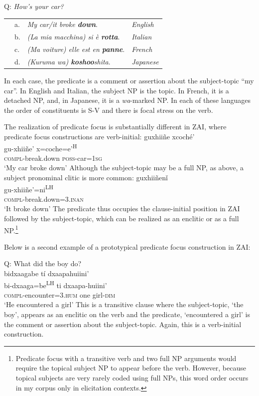 \ea\label{PF}Q: \textit{How's your car?}
\begin{table}[H] 
\begin{tabular}{l l l l}
 & a. & \textit{My car/it broke \textbf{down}}. & \textit{English} \\
 & b. & \textit{(La mia macchina) si \`{e} \textbf{rotta}}. & \textit{Italian} \\
 & c. & \textit{(Ma voiture) elle est en \textbf{panne}}. & \textit{French} \\
  & d. & \textit{(Kuruma wa) \textbf{koshoo}shita}. & \textit{Japanese} \\
\end{tabular}
\end{table}
\z

In each case, the predicate is a comment or assertion about the subject-topic ``my car''. In English and Italian, the subject NP is the topic. In French, it is a detached NP, and, in Japanese, it is a \textit{wa}-marked NP. In each of these languages the order of constituents is S-V and there is focal stress on the verb. 

The realization of predicate focus is substantially different in ZAI, where predicate focus constructions are verb-initial: 
\ea\label{predfoc1}
\glll guxhii\~{n}e xcoch\'{e}'  \\
gu-xhii\~{n}e' x=coche=e'\textsuperscript{H}  \\
\textsc{compl}-break.down \textsc{poss}-car=\textsc{1sg}  \\
\glt `My car broke down'
\z
Although the subject-topic may be a full NP, as above, a subject pronominal clitic is more common:
\ea\label{predfoc2}
\glll guxhii\~{n}en\v{i} \\
gu-xhii\~{n}e'=ni\textsuperscript{LH}  \\
\textsc{compl}-break.down=\textsc{3.inan} \\
\glt `It broke down'
\z
The predicate thus occupies the clause-initial position in ZAI followed by the subject-topic, which can be realized as an enclitic or as a full NP.\footnote{Predicate focus with a transitive verb and two full NP arguments would require the topical subject NP to appear before the verb. However, because topical subjects are very rarely coded using full NPs, this word order occurs in my corpus only in elicitation contexts.}

Below is a second example of a prototypical predicate focus construction in ZAI:

\ea\label{predfocus}
{Q: What did the boy do?} \\
\glll bidxaagabe t\'{i} dxaapahuiini' \\
bi-dxaaga=be\textsuperscript{LH} ti dxaapa-huiini' \\
\textsc{compl}-encounter=\textsc{3.hum} one girl-\textsc{dim} \\
\glt `He encountered a girl' 
\z
This is a transitive clause where the subject-topic, `the boy', appears as an enclitic on the verb and the predicate, `encountered a girl' is the comment or assertion about the subject-topic. Again, this is a verb-initial construction.

